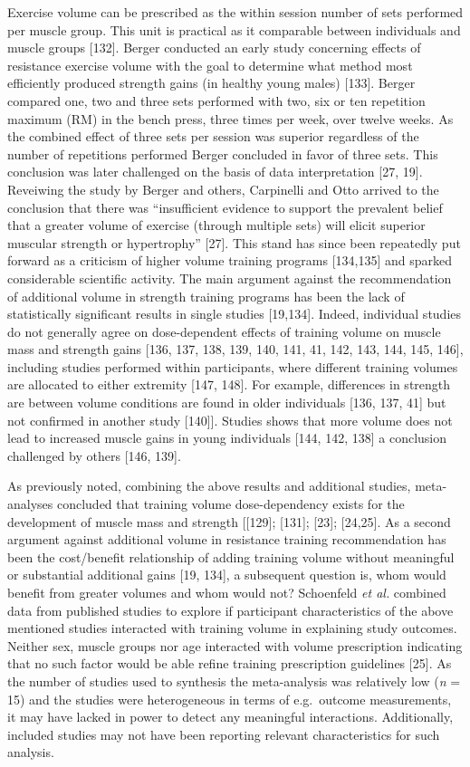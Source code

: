 \documentclass[twoside,10pt]{gihclass} %
\begin{document}
Exercise volume can be prescribed as the within session number of sets performed per muscle group. This unit is practical as it comparable between individuals and muscle groups {[}132{]}.
Berger conducted an early study concerning effects of resistance exercise volume with the goal to determine what method most efficiently produced strength gains (in healthy young males) {[}133{]}. Berger compared one, two and three sets performed with two, six or ten repetition maximum (RM) in the bench press, three times per week, over twelve weeks. As the combined effect of three sets per session was superior regardless of the number of repetitions performed Berger concluded in favor of three sets. This conclusion was later challenged on the basis of data interpretation
{[}27, 19{]}.
Reveiwing the study by Berger and others, Carpinelli and Otto arrived to the conclusion that there was ``insufficient evidence to support the prevalent belief that a greater volume of exercise (through multiple sets) will elicit superior muscular strength or hypertrophy'' {[}27{]}. This stand has since been repeatedly put forward as a criticism of higher volume training programs
{[}134,135{]} and sparked considerable scientific activity. The main argument against the recommendation of additional volume in strength training programs has been the lack of statistically significant results in single studies {[}19,134{]}.
Indeed, individual studies do not generally agree on dose-dependent effects of training volume on muscle mass and strength gains
{[}136, 137, 138, 139, 140, 141, 41, 142, 143, 144, 145, 146{]},
including studies performed within participants, where different training volumes are allocated to either extremity
{[}147, 148{]}.
For example, differences in strength are between volume conditions are found in older individuals
{[}136, 137, 41{]}
but not confirmed in another study
{[}140{]}{]}.
Studies shows that more volume does not lead to increased muscle gains in young individuals
{[}144, 142, 138{]}
a conclusion challenged by others
{[}146, 139{]}.

As previously noted, combining the above results and additional studies, meta-analyses concluded that training volume dose-dependency exists for the development of muscle mass and strength
{[}{[}129{]};
{[}131{]};
{[}23{]};
{[}24,25{]}.
As a second argument against additional volume in resistance training recommendation has been the cost/benefit relationship of adding training volume without meaningful or substantial additional gains
{[}19, 134{]},
a subsequent question is, whom would benefit from greater volumes and whom would not?
Schoenfeld \emph{et al.} combined data from published studies to explore if participant characteristics of the above mentioned studies interacted with training volume in explaining study outcomes. Neither sex, muscle groups nor age interacted with volume prescription indicating that no such factor would be able refine training prescription guidelines
{[}25{]}.
As the number of studies used to synthesis the meta-analysis was relatively low (\emph{n} = 15) and the studies were heterogeneous in terms of e.g.~outcome measurements, it may have lacked in power to detect any meaningful interactions. Additionally, included studies may not have been reporting relevant characteristics for such analysis.
\end{document}
